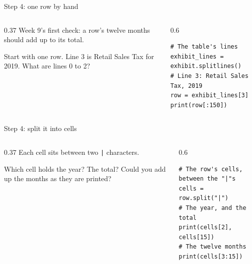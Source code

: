 \documentclass[9pt,aspectratio=169]{beamer}
\begin{document}
\begin{frame}[fragile]{Step 4: one row by hand}
    \begin{columns}[T]
        \begin{column}{0.37\textwidth}
            Week 9's first check: a row's twelve months should add up to its total.

            \medskip
            Start with one row. Line 3 is Retail Sales Tax for 2019. What are lines 0 to 2?
        \end{column}
        \begin{column}{0.6\textwidth}
\begin{lstlisting}
# The table's lines
exhibit_lines = exhibit.splitlines()
# Line 3: Retail Sales Tax, 2019
row = exhibit_lines[3]
print(row[:150])
\end{lstlisting}
        \end{column}
    \end{columns}
\end{frame}

\begin{frame}[fragile]{Step 4: split it into cells}
    \begin{columns}[T]
        \begin{column}{0.37\textwidth}
            Each cell sits between two \texttt{|} characters.

            \medskip
            Which cell holds the year? The total? Could you add up the months as they are printed?
        \end{column}
        \begin{column}{0.6\textwidth}
\begin{lstlisting}
# The row's cells, between the "|"s
cells = row.split("|")
# The year, and the total
print(cells[2], cells[15])
# The twelve months
print(cells[3:15])
\end{lstlisting}
        \end{column}
    \end{columns}
\end{frame}
\end{document}
